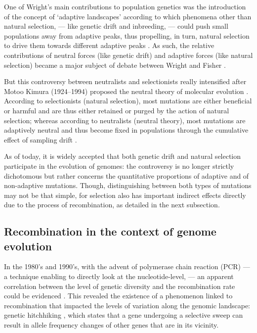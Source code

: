 One of Wright's main contributions to population genetics was the introduction of the concept of ‘adaptive landscapes’ according to which phenomena other than natural selection, — like genetic drift and inbreeding, — could push small populations away from adaptive peaks, thus propelling, in turn, natural selection to drive them towards different adaptive peaks \citep{wright1932roles}.
As such, the relative contributions of neutral forces (like genetic drift) and adaptive forces (like natural selection) became a major subject of debate between Wright and Fisher \citep{plutynski2007drift}.

But this controversy between neutralists and selectionists really intensified after Motoo Kimura (1924--1994) proposed the neutral theory of molecular evolution \citep{kimura1968evolutionary,kimura1991neutral,kimura1986dna}.
According to selectionists (natural selection), most mutations are either beneficial or harmful and are thus either retained or purged by the action of natural selection; whereas according to neutralists (neutral theory), most mutations are adaptively neutral and thus become fixed in populations through the cumulative effect of sampling drift \citep{lewin1996patterns}.

As of today, it is widely accepted that both genetic drift and natural selection participate in the evolution of genomes: the controversy is no longer strictly dichotomous but rather concerns the quantitative proportions of adaptive and of non-adaptive mutations.
Though, distinguishing between both types of mutations may not be that simple, for selection also has important indirect effects directly due to the process of recombination, as detailed in the next subsection.



\subsection{Recombination in the context of genome evolution}

In the 1980's and 1990's, with the advent of polymerase chain reaction (PCR) — a technique enabling to directly look at the nucleotide-level, — an apparent correlation between the level of genetic diversity and the recombination rate could be evidenced \citep{begun1992levels}.
This revealed the existence of a phenomenon linked to recombination that impacted the levels of variation along the genomic landscape: genetic hitchhiking \citep{smith1974hitchhiking}, which states that a gene undergoing a selective sweep can result in allele frequency changes of other genes that are in its vicinity.

